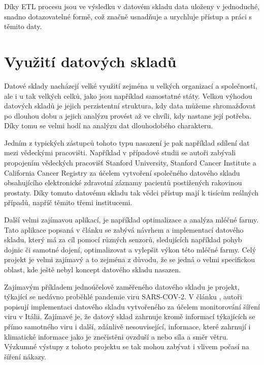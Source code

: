 \documentclass[
  digital,     %
  twoside,     %
  lof,         %
  lot,         %
]{fithesis4}
\begin{document}
Díky ETL procesu jsou ve výsledku v datovém skladu data uloženy v jednoduché,
snadno dotazovatelné formě, což značně usnadňuje a urychluje přístup a práci s těmito daty.

\section{Využití datových skladů}
Datové sklady nacházejí velké využití zejména u velkých organizací a společností, ale i
u tak velkých celků, jako jsou například samostatné státy. Velkou výhodou datových skladů je
jejich perzistentní struktura, kdy data můžeme shromažďovat po dlouhou dobu a jejich
analýzu provést až ve chvíli, kdy nastane její potřeba. Díky tomu se velmi hodí na analýzu dat dlouhodobého charakteru.

Jedním z typických zástupců tohoto typu nasazení je pak například sdílení dat mezi
vědeckými pracovišti. Například v případové studii  \parencite{Seneviratne20180124} 
se autoři zabývali propojením vědeckých pracovišť Stanford University, Stanford Cancer Institute a California Cancer Registry za účelem vytvoření
společného datového skladu obsahujícího elektronické zdravotní záznamy pacientů
postižených rakovinou prostaty. Díky tomuto datovému skladu tak vědci přístup mají
k tisícům reálných případů, napříč těmito třemi institucemi.

Další velmi zajímavou aplikací, je například optimalizace a analýza mléčné farmy. Tato
aplikace popsaná v článku  \parencite{Schuetz20180326} se zabývá návrhem a implementací
datového skladu, který má za cíl pomocí různých senzorů, sledujících například pohyb dojnic
či samotné dojení, optimalizovat a vylepšit výkon této mléčné farmy. Celý projekt je velmi
zajímavý a to zejména z důvodu, že se jedná o velmi specifickou oblast, kde ještě nebyl
koncept datového skladu nasazen.

Zajímavým příkladem jednoúčelově zaměřeného datového skladu je projekt, týkající
se nedávno proběhlé pandemie viru SARS-COV-2. V článku  \parencite{Agapito2020},
autoři popisují implementaci datového skladu vytvořeného za účelem monitorování
šíření viru v Itálii. Zajímavé je, že datový sklad zahrnuje kromě informací týkajících se přímo
samotného viru i další, zdánlivě nesouvisející, informace, které zahrnují i klimatické informace
jako je znečistěni ovzduší a nebo síla a směr větru. Výzkumné výstupy z tohoto projektu se tak mohou zabývat i vlivem počasí na
šíření nákazy. 
\end{document}
